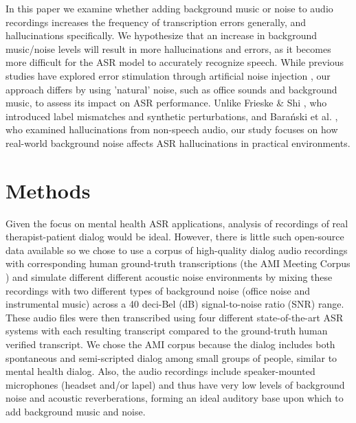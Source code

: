 \documentclass{article}
\begin{document}
In this paper we examine whether adding background music or noise to audio recordings increases the frequency of transcription errors generally, and hallucinations specifically. We hypothesize that an increase in background music/noise levels will result in more hallucinations and errors, as it becomes more difficult for the ASR model to accurately recognize speech. While previous studies have explored error stimulation through artificial noise injection \cite{frieske2024hallucinations, barański2025whisperasrhallucinations}, our approach differs by using 'natural' noise, such as office sounds and background music, to assess its impact on ASR performance. Unlike Frieske \& Shi \cite{frieske2024hallucinations}, who introduced label mismatches and synthetic perturbations, and Barański et al. \cite{barański2025whisperasrhallucinations}, who examined hallucinations from non-speech audio, our study focuses on how real-world background noise affects ASR hallucinations in practical environments. 

\section{Methods}
Given the focus on mental health ASR applications, analysis of recordings of real therapist-patient dialog would be ideal. However, there is little such open-source data available so we chose to use a corpus of high-quality dialog audio recordings with corresponding human ground-truth transcriptions (the AMI Meeting Corpus \cite{ami2006}) and simulate different different acoustic noise environments by mixing these recordings with two different types of background noise (office noise and instrumental music) across a 40 deci-Bel (dB) signal-to-noise ratio (SNR) range. These audio files were then transcribed using four different state-of-the-art ASR systems with each resulting transcript compared to the ground-truth human verified transcript. We chose the AMI corpus because the dialog includes both spontaneous and semi-scripted dialog among small groups of people, similar to mental health dialog. Also, the audio recordings include speaker-mounted microphones (headset and/or lapel) and thus have very low levels of background noise and acoustic reverberations, forming an ideal auditory base upon which to add background music and noise.
\end{document}
